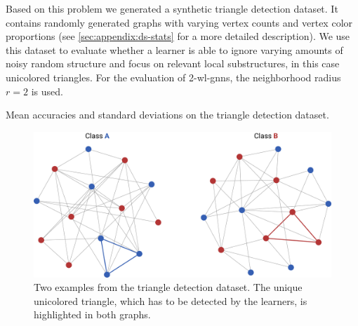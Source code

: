 Based on this problem we generated a synthetic triangle detection dataset.
It contains randomly generated graphs with varying vertex counts and vertex color proportions (see \cref{sec:appendix:ds-stats} for a more detailed description).
We use this dataset to evaluate whether a learner is able to ignore varying amounts of noisy random structure and focus on relevant local substructures, in this case unicolored triangles.
For the evaluation of 2-\acs{wl}-\acsp{gnn}, the neighborhood radius $r = 2$ is used.
\begin{table}[t]
	\caption{Mean accuracies and standard deviations on the triangle detection dataset.}\label{tbl:eval:synthetic}
	\centering
\end{table}
\begin{figure}[t]
	\centering
	\includegraphics[width=0.7\linewidth]{gfx/evaluation/triangle-problem.pdf}
	\caption[Two example graphs from the triangle detection dataset.]{
		Two examples from the triangle detection dataset.
		The unique unicolored triangle, which has to be detected by the learners, is highlighted in both graphs.
	}\label{fig:evaluation:triangle-problem}
\end{figure}

